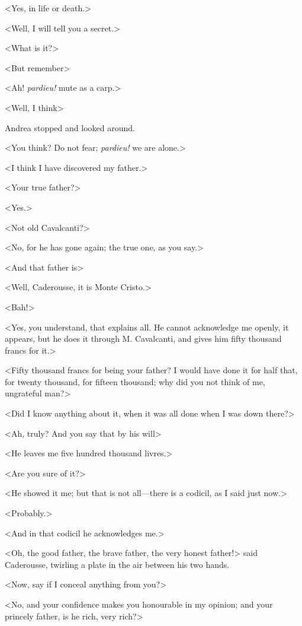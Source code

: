  <Yes, in life or death.> 

 <Well, I will tell you a secret.> 

 <What is it?> 

 <But remember\longdash> 

 <Ah! \textit{pardieu!} mute as a carp.> 

 <Well, I think\longdash> 

 Andrea stopped and looked around. 

 <You think? Do not fear; \textit{pardieu!} we are alone.> 

 <I think I have discovered my father.> 

 <Your true father?> 

 <Yes.> 

 <Not old Cavalcanti?> 

 <No, for he has gone again; the true one, as you say.> 

 <And that father is\longdash> 

 <Well, Caderousse, it is Monte Cristo.> 

 <Bah!> 

 <Yes, you understand, that explains all. He cannot acknowledge me openly, it appears, but he does it through M. Cavalcanti, and gives him fifty thousand francs for it.> 

 <Fifty thousand francs for being your father? I would have done it for half that, for twenty thousand, for fifteen thousand; why did you not think of me, ungrateful man?> 

 <Did I know anything about it, when it was all done when I was down there?> 

 <Ah, truly? And you say that by his will\longdash> 

 <He leaves me five hundred thousand livres.> 

 <Are you sure of it?> 

 <He showed it me; but that is not all—there is a codicil, as I said just now.> 

 <Probably.> 

 <And in that codicil he acknowledges me.> 

 <Oh, the good father, the brave father, the very honest father!> said Caderousse, twirling a plate in the air between his two hands. 

 <Now, say if I conceal anything from you?> 

 <No, and your confidence makes you honourable in my opinion; and your princely father, is he rich, very rich?> 


